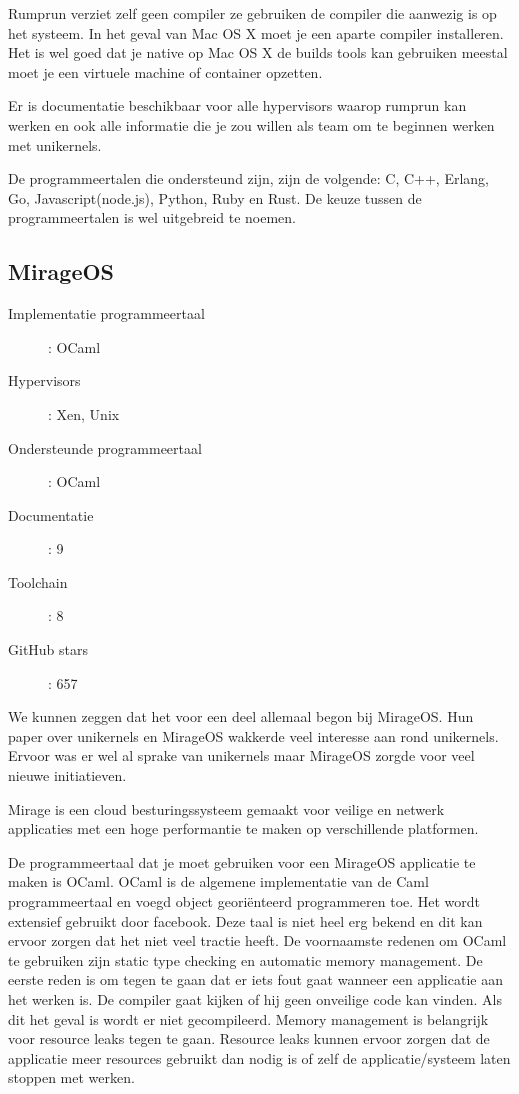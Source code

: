 \documentclass[pdftex,a4paper,12pt,twoside]{report}
\begin{document}
Rumprun verziet zelf geen compiler ze gebruiken de compiler die aanwezig is op het systeem. In het geval van Mac OS X moet je een aparte compiler installeren. Het is wel goed dat je native op Mac OS X de builds tools kan gebruiken meestal moet je een virtuele machine of container opzetten.

Er is documentatie beschikbaar voor alle hypervisors waarop rumprun kan werken en ook alle informatie die je zou willen als team om te beginnen werken met unikernels.

De programmeertalen die ondersteund zijn, zijn de volgende: C, C++, Erlang, Go, Javascript(node.js), Python, Ruby en Rust. De keuze tussen de programmeertalen is wel uitgebreid te noemen.

\subsection{MirageOS}

\begin{description}
  \item [Implementatie programmeertaal]: OCaml
  \item [Hypervisors]: Xen, Unix
  \item [Ondersteunde programmeertaal]: OCaml
  \item [Documentatie]: 9
  \item [Toolchain]: 8
  \item [GitHub stars]: 657
\end{description}

We kunnen zeggen dat het voor een deel allemaal begon bij MirageOS. Hun paper over unikernels en MirageOS wakkerde veel interesse aan rond unikernels. Ervoor was er wel al sprake van unikernels maar MirageOS zorgde voor veel nieuwe initiatieven.

Mirage is een cloud besturingssysteem gemaakt voor veilige en netwerk applicaties met een hoge performantie te maken op verschillende platformen.

De programmeertaal dat je moet gebruiken voor een MirageOS applicatie te maken is OCaml. 
OCaml is de algemene implementatie van de Caml programmeertaal en voegd object georiënteerd programmeren toe. Het wordt extensief gebruikt door facebook. Deze taal is niet heel erg bekend en dit kan ervoor zorgen dat het niet veel tractie heeft.
De voornaamste redenen om OCaml te gebruiken zijn static type checking en automatic memory management. De eerste reden is om tegen te gaan dat er iets fout gaat wanneer een applicatie aan het werken is. De compiler gaat kijken of hij geen onveilige code kan vinden. Als dit het geval is wordt er niet gecompileerd.
Memory management is belangrijk voor resource leaks tegen te gaan. Resource leaks kunnen ervoor zorgen dat de applicatie meer resources gebruikt dan nodig is of zelf de applicatie/systeem laten stoppen met werken.
\end{document}
